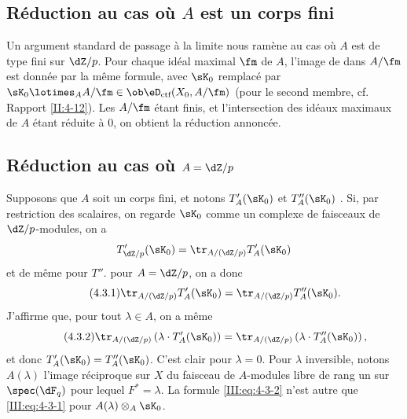 \subsection{Réduction au cas où \texorpdfstring{$A$}{A} est un corps fini}\label{III:4-2}

Un argument standard de passage à la limite nous ramène au cas où $A$ est 
de type fini sur $\dZ/p$. Pour chaque idéal maximal $\fm$ de $A$, l'image de 
 dans $A/\fm$ est donnée par la même 
formule, avec $\sK_0$ remplacé par 
$\sK_0\lotimes_A A/\fm\in\ob\eD_\text{ctf}(X_0,A/\fm)$ (pour le second membre, 
cf. Rapport \ref{II:4-12}). Les $A/\fm$ étant finis, et l'intersection des 
idéaux maximaux de $A$ étant réduite à $0$, on obtient la réduction 
annoncée.





\subsection{Réduction au cas où \texorpdfstring{$A=\dZ/p$}{A=Z/p}}\label{III:4-3}

Supposons que $A$ soit un corps fini, et notons $T_A'(\sK_0)$ et $T_A''(\sK_0)$ 
. Si, par restriction des scalaires, on 
regarde $\sK_0$ comme un complexe de faisceaux de $\dZ/p$-modules, on a 
\[
  T_{\dZ/p}'(\sK_0) = \tr_{A/(\dZ/p)} T_A'(\sK_0)
\]
et de même pour $T''$.  pour $A=\dZ/p$, on a donc 
\begin{equation*}\tag{4.3.1}\label{III:eq:4-3-1}
  \tr_{A/(\dZ/p)} T_A'(\sK_0) = \tr_{A/(\dZ/p)} T_A''(\sK_0) \text{.}
\end{equation*}
J'affirme que, pour tout $\lambda\in A$, on a même 
\begin{equation*}\tag{4.3.2}\label{III:eq:4-3-2}
  \tr_{A/(\dZ/p)}\left(\lambda\cdot T_A'(\sK_0)\right) = \tr_{A/(\dZ/p)}\left(\lambda\cdot T_A''(\sK_0)\right) \text{,}
\end{equation*}
et donc $T_A'(\sK_0) = T_A''(\sK_0)$. C'est clair pour $\lambda=0$. Pour 
$\lambda$ inversible, notons $A(\lambda)$ l'image réciproque sur $X$ du 
faisceau de $A$-modules libre de rang un sur $\spec(\dF_q)$ pour lequel 
$F^*=\lambda$. La formule \eqref{III:eq:4-3-2} n'est autre que 
\eqref{III:eq:4-3-1} pour $A(\lambda)\otimes_A \sK_0$. 





